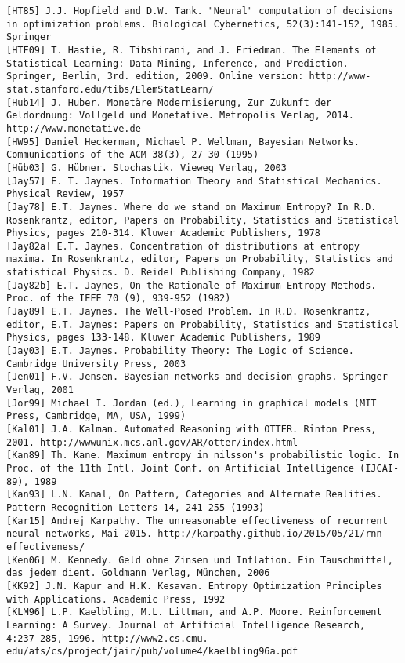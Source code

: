 \documentclass[10pt]{article}
\begin{document}
\begin{verbatim}
[HT85] J.J. Hopfield and D.W. Tank. "Neural" computation of decisions in optimization problems. Biological Cybernetics, 52(3):141-152, 1985. Springer
[HTF09] T. Hastie, R. Tibshirani, and J. Friedman. The Elements of Statistical Learning: Data Mining, Inference, and Prediction. Springer, Berlin, 3rd. edition, 2009. Online version: http://www-stat.stanford.edu/tibs/ElemStatLearn/
[Hub14] J. Huber. Monetäre Modernisierung, Zur Zukunft der Geldordnung: Vollgeld und Monetative. Metropolis Verlag, 2014. http://www.monetative.de
[HW95] Daniel Heckerman, Michael P. Wellman, Bayesian Networks. Communications of the ACM 38(3), 27-30 (1995)
[Hüb03] G. Hübner. Stochastik. Vieweg Verlag, 2003
[Jay57] E. T. Jaynes. Information Theory and Statistical Mechanics. Physical Review, 1957
[Jay78] E.T. Jaynes. Where do we stand on Maximum Entropy? In R.D. Rosenkrantz, editor, Papers on Probability, Statistics and Statistical Physics, pages 210-314. Kluwer Academic Publishers, 1978
[Jay82a] E.T. Jaynes. Concentration of distributions at entropy maxima. In Rosenkrantz, editor, Papers on Probability, Statistics and statistical Physics. D. Reidel Publishing Company, 1982
[Jay82b] E.T. Jaynes, On the Rationale of Maximum Entropy Methods. Proc. of the IEEE 70 (9), 939-952 (1982)
[Jay89] E.T. Jaynes. The Well-Posed Problem. In R.D. Rosenkrantz, editor, E.T. Jaynes: Papers on Probability, Statistics and Statistical Physics, pages 133-148. Kluwer Academic Publishers, 1989
[Jay03] E.T. Jaynes. Probability Theory: The Logic of Science. Cambridge University Press, 2003
[Jen01] F.V. Jensen. Bayesian networks and decision graphs. Springer-Verlag, 2001
[Jor99] Michael I. Jordan (ed.), Learning in graphical models (MIT Press, Cambridge, MA, USA, 1999)
[Kal01] J.A. Kalman. Automated Reasoning with OTTER. Rinton Press, 2001. http://wwwunix.mcs.anl.gov/AR/otter/index.html
[Kan89] Th. Kane. Maximum entropy in nilsson's probabilistic logic. In Proc. of the 11th Intl. Joint Conf. on Artificial Intelligence (IJCAI-89), 1989
[Kan93] L.N. Kanal, On Pattern, Categories and Alternate Realities. Pattern Recognition Letters 14, 241-255 (1993)
[Kar15] Andrej Karpathy. The unreasonable effectiveness of recurrent neural networks, Mai 2015. http://karpathy.github.io/2015/05/21/rnn-effectiveness/
[Ken06] M. Kennedy. Geld ohne Zinsen und Inflation. Ein Tauschmittel, das jedem dient. Goldmann Verlag, München, 2006
[KK92] J.N. Kapur and H.K. Kesavan. Entropy Optimization Principles with Applications. Academic Press, 1992
[KLM96] L.P. Kaelbling, M.L. Littman, and A.P. Moore. Reinforcement Learning: A Survey. Journal of Artificial Intelligence Research, 4:237-285, 1996. http://www2.cs.cmu. edu/afs/cs/project/jair/pub/volume4/kaelbling96a.pdf

\end{verbatim}
\end{document}
